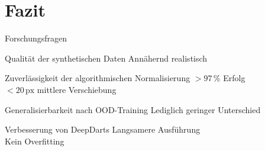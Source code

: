 
\section{Fazit}

\newlength{\blocklabelwidth}

\begin{frame}{Forschungsfragen}
    \begin{block}{ Qualität der synthetischen Daten}
        \hphantom{~~~~~~} Annähernd realistisch
    \end{block}

    \begin{block}{ Zuverlässigkeit der algorithmischen Normalisierung}
        \hphantom{~~~~~~} $>97\,\%$ Erfolg\\
        \hphantom{~~~~~~} $<20\,\text{px}$ mittlere Verschiebung
    \end{block}

    \begin{block}{ Generalisierbarkeit nach OOD-Training}
        \hphantom{~~~~~~} Lediglich geringer Unterschied
    \end{block}

    \begin{block}{ Verbesserung von DeepDarts}
        \hphantom{~~~~~~} Langsamere Ausführung\\
        \hphantom{~~~~~~} Kein Overfitting
    \end{block}
\end{frame}
